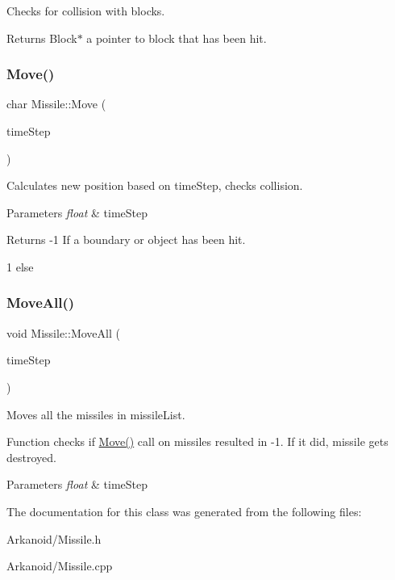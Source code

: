 Checks for collision with blocks. 

\begin{DoxyReturn}{Returns}
Block$\ast$ a pointer to block that has been hit. 
\end{DoxyReturn}
\mbox{\label{class_missile_a25babb76b7fb981142721fa02a265b31}} 
\subsubsection{\texorpdfstring{Move()}{Move()}}
{\footnotesize\ttfamily char Missile\+::\+Move (\begin{DoxyParamCaption}\item[{float}]{time\+Step }\end{DoxyParamCaption})}



Calculates new position based on time\+Step, checks collision. 


\begin{DoxyParams}{Parameters}
{\em float} & time\+Step\\
\hline
\end{DoxyParams}
\begin{DoxyReturn}{Returns}
-\/1 If a boundary or object has been hit. 

1 else 
\end{DoxyReturn}
\mbox{\label{class_missile_a7456f2bdca970cb8511c74696dd643b4}} 
\subsubsection{\texorpdfstring{Move\+All()}{MoveAll()}}
{\footnotesize\ttfamily void Missile\+::\+Move\+All (\begin{DoxyParamCaption}\item[{float}]{time\+Step }\end{DoxyParamCaption})\hspace{0.3cm}{\ttfamily [static]}}



Moves all the missiles in missile\+List. 

Function checks if \hyperlink{class_missile_a25babb76b7fb981142721fa02a265b31}{Move()} call on missiles resulted in -\/1. If it did, missile gets destroyed.


\begin{DoxyParams}{Parameters}
{\em float} & time\+Step \\
\hline
\end{DoxyParams}


The documentation for this class was generated from the following files\+:\begin{DoxyCompactItemize}
\item 
Arkanoid/Missile.\+h\item 
Arkanoid/Missile.\+cpp\end{DoxyCompactItemize}
